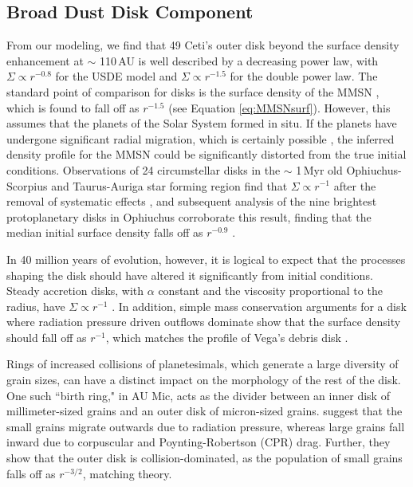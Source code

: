 
\subsection{Broad Dust Disk Component}

From our modeling, we find that 49 Ceti's outer disk beyond the surface density enhancement at $\sim$ 110\,AU is well described by a decreasing power law, with $\Sigma \propto r^{-0.8}$ for the USDE model and $\Sigma \propto r^{-1.5}$ for the double power law. The standard point of comparison for disks is the surface density of the MMSN \citep{Weid77,Haya81}, which is found to fall off as $r^{-1.5}$ (see Equation \ref{eq:MMSNsurf}). However, this assumes that the planets of the Solar System formed in situ. If the planets have undergone significant radial migration, which is certainly possible \citep{Levi03}, the inferred density profile for the MMSN could be significantly distorted from the true initial conditions. Observations of 24 circumstellar disks in the $\sim$ 1\,Myr old Ophiuchus-Scorpius and Taurus-Auriga star forming region find that $\Sigma \propto r^{-1}$ after the removal of systematic effects \citep{Andr07}, and subsequent analysis of the nine brightest protoplanetary disks in Ophiuchus corroborate this result, finding that the median initial surface density falls off as $r^{-0.9}$ \citep{Andr09}.  

In 40 million years of evolution, however, it is logical to expect that the processes shaping the disk should have altered it significantly from initial conditions. Steady accretion disks, with $\alpha$ constant and the viscosity proportional to the radius, have $\Sigma \propto r^{-1}$ \citep{Shak73,Hart98}. In addition, simple mass conservation arguments for a disk where radiation pressure driven outflows dominate show that the surface density should fall off as $r^{-1}$, which matches the profile of Vega's debris disk \citep{Su05}. 

Rings of increased collisions of planetesimals, which generate a large diversity of grain sizes, can have a distinct impact on the morphology of the rest of the disk. One such ``birth ring," in AU Mic, acts as the divider between an inner disk of millimeter-sized grains and an outer disk of micron-sized grains. \cite{Stru06} suggest that the small grains migrate outwards due to radiation pressure, whereas large grains fall inward due to corpuscular and Poynting-Robertson (CPR) drag. Further, they show that the outer disk is collision-dominated, as the population of small grains falls off as $r^{-3/2}$, matching theory. 

